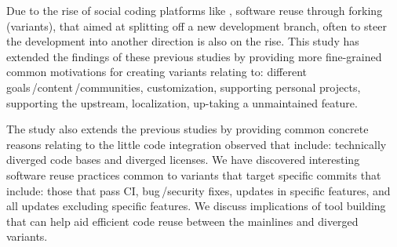 Due to the rise of social coding platforms like \gh, software reuse through forking (variants), that aimed at splitting off a new development branch, often to steer the development into another direction is also on the rise. 
This study has extended the findings of these previous studies by providing more fine-grained common motivations for creating variants relating to: different goals\,/content\,/communities, customization, supporting personal projects, supporting the upstream, localization, up-taking a unmaintained feature.

The study also extends the previous studies by providing common concrete reasons relating to the little code integration observed that include: technically diverged code bases and diverged licenses.
We have discovered interesting software reuse practices common to variants that target specific commits that include: those that pass CI, bug\,/security fixes, updates in specific features, and all updates excluding specific features. We
discuss implications of tool building that can help aid efficient code reuse between the mainlines and diverged variants.
